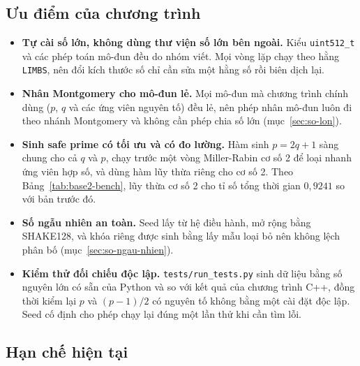 \subsection{Ưu điểm của chương trình}

\begin{itemize}
  \item \textbf{Tự cài số lớn, không dùng thư viện số lớn bên ngoài.} Kiểu \texttt{uint512\_t} và các phép toán mô-đun đều do nhóm viết. Mọi vòng lặp chạy theo hằng \texttt{LIMBS}, nên đổi kích thước số chỉ cần sửa một hằng số rồi biên dịch lại.
  \item \textbf{Nhân Montgomery cho mô-đun lẻ.} Mọi mô-đun mà chương trình chính dùng ($p$, $q$ và các ứng viên nguyên tố) đều lẻ, nên phép nhân mô-đun luôn đi theo nhánh Montgomery và không cần phép chia số lớn (mục~\ref{sec:so-lon}).
  \item \textbf{Sinh safe prime có tối ưu và có đo lường.} Hàm sinh $p = 2q + 1$ sàng chung cho cả $q$ và $p$, chạy trước một vòng Miller-Rabin cơ số 2 để loại nhanh ứng viên hợp số, và dùng hàm lũy thừa riêng cho cơ số 2. Theo Bảng~\ref{tab:base2-bench}, lũy thừa cơ số 2 cho tỉ số tổng thời gian $0{,}9241$ so với bản trước đó.
  \item \textbf{Số ngẫu nhiên an toàn.} Seed lấy từ hệ điều hành, mở rộng bằng SHAKE128, và khóa riêng được sinh bằng lấy mẫu loại bỏ nên không lệch phân bố (mục~\ref{sec:so-ngau-nhien}).
  \item \textbf{Kiểm thử đối chiếu độc lập.} \texttt{tests/run\_tests.py} sinh dữ liệu bằng số nguyên lớn có sẵn của Python và so với kết quả của chương trình C++, đồng thời kiểm lại $p$ và $(p-1)/2$ có nguyên tố không bằng một cài đặt độc lập. Seed cố định cho phép chạy lại đúng một lần thử khi cần tìm lỗi.
\end{itemize}

\subsection{Hạn chế hiện tại}

